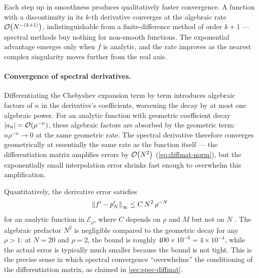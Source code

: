 Each step up in smoothness produces qualitatively faster convergence.
A function with a discontinuity in its $k$-th derivative converges at
the algebraic rate $\mathcal{O}\!\left(N^{-(k+1)}\right)$, indistinguishable from a
finite-difference method of order $k + 1$ --- spectral methods buy
nothing for non-smooth functions.  The exponential advantage emerges
only when $f$ is analytic, and the rate improves as the nearest complex
singularity moves further from the real axis.

\paragraph{Convergence of spectral derivatives.}

Differentiating the Chebyshev expansion term by term introduces
algebraic factors of $n$ in the derivative's coefficients, worsening
the decay by at most one algebraic power.  For an analytic function
with geometric coefficient decay $\left\lvert a_n \right\rvert = \mathcal{O}\!\left(\rho^{-n}\right)$,
these algebraic factors are absorbed by the geometric term:
$n\rho^{-n} \to 0$ at the same geometric rate.  The spectral
derivative therefore converges geometrically at essentially the same
rate as the function itself --- the differentiation matrix amplifies
errors by $\mathcal{O}\!\left(N^2\right)$ (\cref{eq:diffmat-norm}), but the
exponentially small interpolation error shrinks fast enough to
overwhelm this amplification.

Quantitatively, the derivative error satisfies
%
\begin{equation}
  \left\lVert f' - p_N' \right\rVert_\infty
    \leq C\,N^2\,\rho^{-N}
  \label{eq:spec-deriv-error}
\end{equation}
%
for an analytic function in $\mathcal{E}_\rho$, where $C$ depends on
$\rho$ and $M$ but not on $N$ \cite{Trefethen2000}.  The algebraic
prefactor $N^2$ is negligible compared to the geometric decay for any
$\rho > 1$: at $N = 20$ and $\rho = 2$, the bound is roughly
$400 \times 10^{-6} = 4 \times 10^{-4}$, while the actual error is
typically much smaller because the bound is not tight.  This is the
precise sense in which spectral convergence ``overwhelms'' the
conditioning of the differentiation matrix, as claimed in
\cref{sec:spec-diffmat}.
